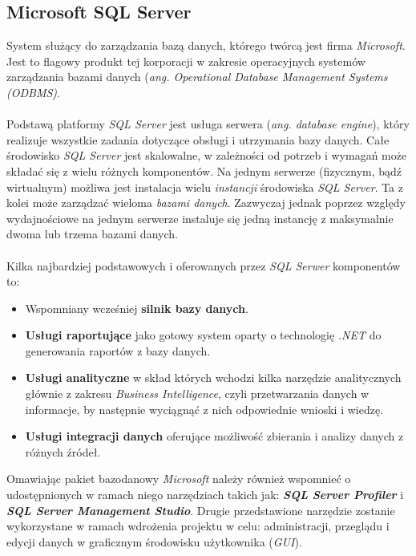 \subsection{Microsoft SQL Server}
\quad System służący do zarządzania bazą danych, którego twórcą jest firma \textit{Microsoft}. Jest to flagowy produkt tej korporacji w zakresie operacyjnych systemów zarządzania bazami danych (\textit{ang. Operational Database Management Systems (ODBMS)}.\\
    \\
    Podstawą platformy \textit{SQL Server} jest usługa serwera (\textit{ang. database engine}), który realizuje wszystkie zadania dotyczące obsługi i utrzymania bazy danych. Całe środowisko \textit{SQL Server} jest skalowalne, w zależności od potrzeb i wymagań może składać się z wielu różnych komponentów. Na jednym serwerze (fizycznym, bądź wirtualnym)  możliwa jest instalacja wielu \textit{instancji} środowiska \textit{SQL Server}. Ta z kolei może zarządzać wieloma \textit{bazami danych}. Zazwyczaj jednak poprzez względy wydajnościowe na jednym serwerze instaluje się jedną instancję z maksymalnie dwoma lub trzema bazami danych.\\
    \\
    Kilka najbardziej podstawowych i oferowanych przez \textit{SQL Serwer} komponentów to:
    \begin{itemize}
        \item Wspomniany wcześniej \textbf{silnik bazy danych}.
        \item \textbf{Usługi raportujące} jako gotowy system oparty o technologię \textit{.NET} do generowania raportów z bazy danych.
        \item \textbf{Usługi analityczne} w skład których wchodzi kilka narzędzie analitycznych głównie z zakresu \textit{Business Intelligence}, czyli przetwarzania danych w informacje, by następnie wyciągnąć z nich odpowiednie wnioski i wiedzę.
        \item \textbf{Usługi integracji danych} oferujące możliwość zbierania i analizy danych z różnych źródeł. 
    \end{itemize}
    Omawiając pakiet bazodanowy \textit{Microsoft} należy również wspomnieć o udostępnionych w ramach niego narzędziach takich jak: \textbf{\textit{SQL Server Profiler}} i \textbf{\textit{SQL Server Management Studio}}. Drugie przedstawione narzędzie zostanie wykorzystane w ramach wdrożenia projektu w celu: administracji, przeglądu i edycji danych w graficznym środowisku użytkownika (\textit{GUI}).
    

